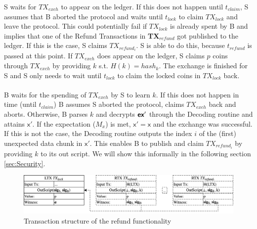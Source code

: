 \documentclass{cacthesis}
\newcounter{protocol}
\begin{document}
        S waits for $TX_{exch}$ to appear on the ledger. If this does not happen until $t_{claim}$, S assumes that B aborted the protocol and waits until $t_{lock}$ to claim $TX_{lock}$ and leave the protocol. This could potentially fail if $TX_{lock}$ is already spent by B and implies that one of the Refund Transactions in \textbf{TX$_{{refund}}$} got published to the ledger. If this is the case, S claims $TX_{{refund}_i}$. S is able to do this, because $t_{refund}$ is passed at this point. If $TX_{exch}$ does appear on the ledger, S claims $p$ coins through $TX_{exch}$ by providing $k$ s.t. $H(k) = hash_k$. The exchange is finished for S and S only needs to wait until $t_{lock}$ to claim the locked coins in $TX_{lock}$ back. \\\\
        B waits for the spending of $TX_{exch}$ by S to learn $k$. If this does not happen in time (until $t_{claim}$) B assumes S aborted the protocol, claims $TX_{exch}$ back and aborts. Otherwise, B parses $k$ and decrypts $\textsf{\textbf{ex}}'$ through the Decoding routine and attains $\textsf{x}'$. If the expectation ($M_x$) is met, $\textsf{x}' = \textsf{x}$ and the exchange was successful. If this is not the case, the Decoding routine outputs the index $i$ of the (first) unexpected data chunk in $\textsf{x}'$. This enables B to publish and claim $TX_{{refund}_i}$ by providing $k$ to its out script. We will show this informally in the following section \ref{sec:Security}. 


        
        
        \begin{figure}
            \begin{center}
                \includegraphics[width=\textwidth]{images/locking_refund_tx_figure.png}
              \caption{Transaction structure of the refund functionality}
              \label{fig:lockingRefundTx}
            \end{center}
            \end{figure}
            
\end{document}
